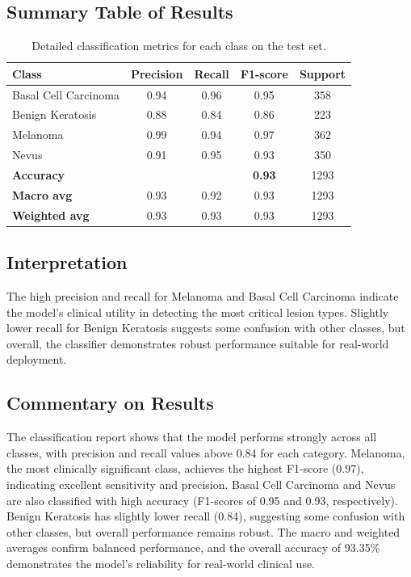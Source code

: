 \documentclass[a4paper,12pt]{report}
\begin{document}
\begin{spacing}{1.5}
    \subsection*{Summary Table of Results}
    \begin{table}[H]
    \centering
    \renewcommand{\arraystretch}{1.2}
    \begin{tabular}{lcccc}
    \hline
    \textbf{Class} & \textbf{Precision} & \textbf{Recall} & \textbf{F1-score} & \textbf{Support} \\
    \hline
    Basal Cell Carcinoma & 0.94 & 0.96 & 0.95 & 358 \\
    Benign Keratosis     & 0.88 & 0.84 & 0.86 & 223 \\
    Melanoma             & 0.99 & 0.94 & 0.97 & 362 \\
    Nevus                & 0.91 & 0.95 & 0.93 & 350 \\
    \hline
    \textbf{Accuracy}    &      &      & \textbf{0.93} & 1293 \\
    \textbf{Macro avg}   & 0.93 & 0.92 & 0.93 & 1293 \\
    \textbf{Weighted avg}& 0.93 & 0.93 & 0.93 & 1293 \\
    \hline
    \end{tabular}
    \caption{Detailed classification metrics for each class on the test set.}
    \end{table}

    \subsection*{Interpretation}
    The high precision and recall for Melanoma and Basal Cell Carcinoma indicate the model's clinical utility in detecting the most critical lesion types. Slightly lower recall for Benign Keratosis suggests some confusion with other classes, but overall, the classifier demonstrates robust performance suitable for real-world deployment.
    
    \subsection*{Commentary on Results}
    The classification report shows that the model performs strongly across all classes, with precision and recall values above 0.84 for each category. Melanoma, the most clinically significant class, achieves the highest F1-score (0.97), indicating excellent sensitivity and precision. Basal Cell Carcinoma and Nevus are also classified with high accuracy (F1-scores of 0.95 and 0.93, respectively). Benign Keratosis has slightly lower recall (0.84), suggesting some confusion with other classes, but overall performance remains robust. The macro and weighted averages confirm balanced performance, and the overall accuracy of 93.35\% demonstrates the model's reliability for real-world clinical use.


\end{spacing}
\end{document}
